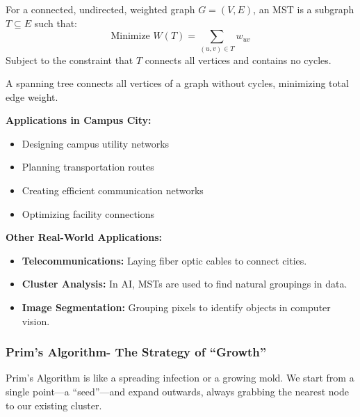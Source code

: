 \documentclass[
  letterpaper,
  DIV=11,
  numbers=noendperiod]{scrreprt}
\providecommand{\tightlist}{%
  \setlength{\itemsep}{0pt}\setlength{\parskip}{0pt}}
\begin{document}
\begin{tcolorbox}[enhanced jigsaw, leftrule=.75mm, rightrule=.15mm, colback=white, colbacktitle=quarto-callout-note-color!10!white, arc=.35mm, opacityback=0, toptitle=1mm, bottomrule=.15mm, bottomtitle=1mm, titlerule=0mm, title=\textcolor{quarto-callout-note-color}{\faInfo}\hspace{0.5em}{Mathematical Definition:}, toprule=.15mm, left=2mm, coltitle=black, breakable, colframe=quarto-callout-note-color-frame, opacitybacktitle=0.6]

For a connected, undirected, weighted graph \(G=(V, E)\), an MST is a
subgraph \(T \subseteq E\) such that: \[
\text{Minimize } W(T) = \sum_{(u,v) \in T} w_{uv}
\] Subject to the constraint that \(T\) connects all vertices and
contains no cycles.

A spanning tree connects all vertices of a graph without cycles,
minimizing total edge weight.

\end{tcolorbox}

\textbf{Applications in Campus City:}

\begin{itemize}
\tightlist
\item
  Designing campus utility networks
\item
  Planning transportation routes
\item
  Creating efficient communication networks
\item
  Optimizing facility connections
\end{itemize}

\textbf{Other Real-World Applications:}

\begin{itemize}
\tightlist
\item
  \textbf{Telecommunications:} Laying fiber optic cables to connect
  cities.
\item
  \textbf{Cluster Analysis:} In AI, MSTs are used to find natural
  groupings in data.
\item
  \textbf{Image Segmentation:} Grouping pixels to identify objects in
  computer vision.
\end{itemize}

\subsubsection{Prim's Algorithm- The Strategy of
``Growth''}\label{prims-algorithm--the-strategy-of-growth}

Prim's Algorithm is like a spreading infection or a growing mold. We
start from a single point---a ``seed''---and expand outwards, always
grabbing the nearest node to our existing cluster.
\end{document}
